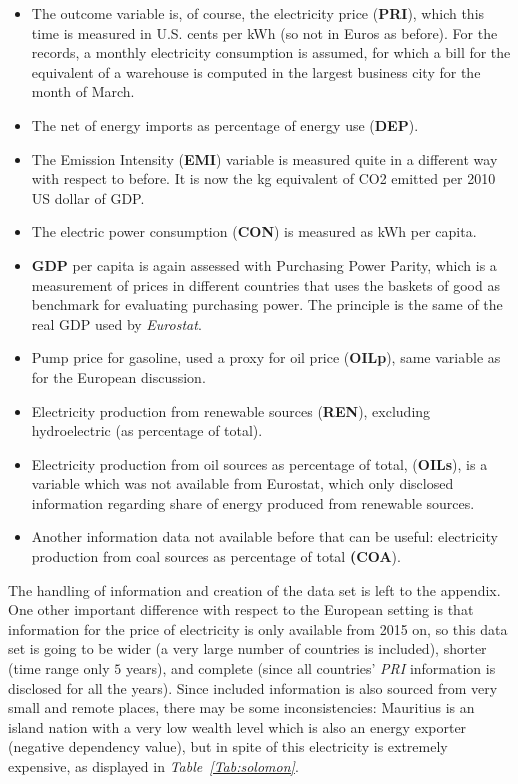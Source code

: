 \documentclass[a4paper,12pt]{book}
\begin{document}
\begin{itemize}
\item The outcome variable is, of course, the electricity price (\textbf{PRI}), which this time is measured in U.S. cents per kWh (so not in Euros as before). For the records, a monthly electricity consumption is assumed, for which a bill for the equivalent of a warehouse is computed in the largest business city for the month of March.
\item The net of energy imports as percentage of energy use (\textbf{DEP}).
\item The Emission Intensity (\textbf{EMI}) variable is measured quite in a different way with respect to before. It is now the kg equivalent of CO2 emitted per 2010 US dollar of GDP.
\item The electric power consumption (\textbf{CON}) is measured as kWh per capita.
\item \textbf{GDP} per capita is again assessed with Purchasing Power Parity, which is a measurement of prices in different countries that uses the baskets of good as benchmark for evaluating purchasing power. The principle is the same of the real GDP used by \textit{Eurostat}.
\item Pump price for gasoline, used a proxy for oil price (\textbf{OILp}), same variable as for the European discussion.
\item Electricity production from renewable sources (\textbf{REN}), excluding hydroelectric (as percentage of total).
\item Electricity production from oil sources as percentage of total, (\textbf{OILs}), is a variable which was not available from Eurostat, which only disclosed information regarding share of energy produced from renewable sources.
\item Another information data not available before that can be useful: electricity production from coal sources as percentage of total \textbf{(COA}).
\end{itemize}

The handling of information and creation of the data set is left to the appendix. One other important difference with respect to the European setting is that information for the price of electricity is only available from 2015 on, so this data set is going to be wider (a very large number of countries is included), shorter (time range only $5$ years), and complete (since all countries' \textit{PRI} information is disclosed for all the years). Since included information is also sourced from very small and remote places, there may be some inconsistencies: Mauritius is an island nation with a very low wealth level which is also an energy exporter (negative dependency value), but in spite of this electricity is extremely expensive, as displayed in \textit{Table~\ref{Tab:solomon}}.
\end{document}
